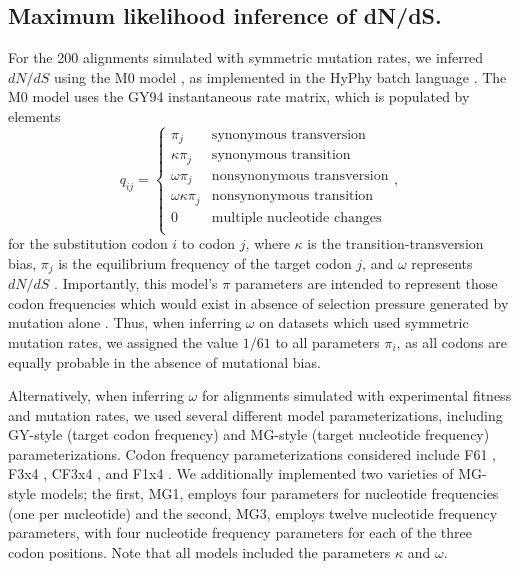 \documentclass[11pt]{article}
\begin{document}
\subsection*{Maximum likelihood inference of dN/dS.}
For the 200 alignments simulated with symmetric mutation rates, we inferred $dN/dS$ using the M0 model \cite{Yangetal2000}, as implemented in the HyPhy batch language \cite{KosakovskyPondetal2005}. The M0 model uses the GY94 instantaneous rate matrix, which is populated by elements
\begin{equation}\label{eq:GY94}
q_{ij} = \left\{ 
	\begin{array}{rl}
	\pi_j                  &\mbox{synonymous transversion} \\
	\kappa \pi_j           &\mbox{synonymous transition} \\
 	\omega \pi_j           &\mbox{nonsynonymous transversion} \\
 	\omega \kappa \pi_j    &\mbox{nonsynonymous transition} \\
	0                      &\mbox{multiple nucleotide changes} \\             
	\end{array} \right.,
\end{equation} for the substitution codon $i$ to codon $j$, where $\kappa$ is the transition-transversion bias, $\pi_j$ is the equilibrium frequency of the target codon $j$, and $\omega$ represents $dN/dS$ \cite{GoldmanYang1994,NielsenYang1998}. Importantly, this model's $\pi$ parameters are intended to represent those codon frequencies which would exist in absence of selection pressure generated by mutation alone \cite{GoldmanYang1994,MuseGaut1994,YN00,Yang2006}. Thus, when inferring $\omega$ on datasets which used symmetric mutation rates, we assigned the value $1/61$ to all parameters $\pi_i$, as all codons are  equally probable in the absence of mutational bias.

Alternatively, when inferring $\omega$ for alignments simulated with experimental fitness and mutation rates, we used several different model parameterizations, including GY-style \cite{GoldmanYang1994} (target codon frequency) and MG-style \cite{MuseGaut1994} (target nucleotide frequency) parameterizations. Codon frequency parameterizations considered include F61 \cite{GoldmanYang1994}, F3x4 \cite{GoldmanYang1994}, CF3x4 \cite{KosakovskyPond2010}, and F1x4 \cite{MuseGaut1994}. We additionally implemented two varieties of MG-style models; the first, MG1, employs four parameters for nucleotide frequencies (one per nucleotide) and the second, MG3, employs twelve nucleotide frequency parameters, with four nucleotide frequency parameters for each of the three codon positions. Note that all models included the parameters $\kappa$ and $\omega$. 
\end{document}
